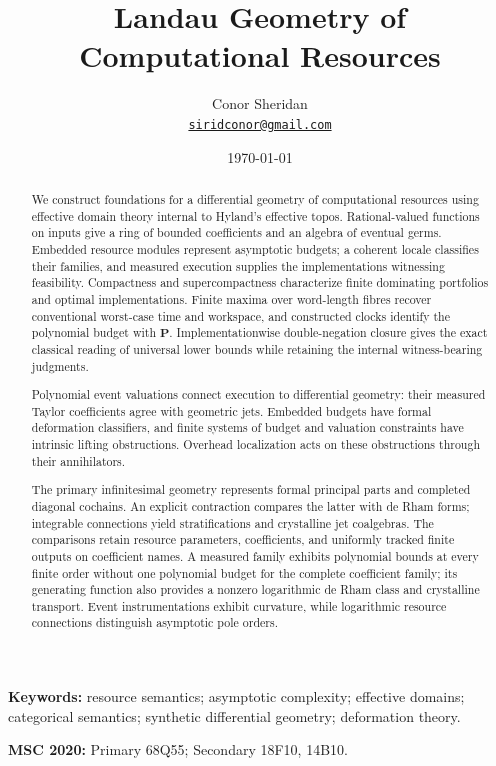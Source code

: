 \documentclass[11pt,a4paper]{article}
\title{Landau Geometry of Computational Resources}
\author{Conor Sheridan\\
  {\normalsize\href{mailto:siridconor@gmail.com}{\texttt{siridconor@gmail.com}}}}
\date{\today}
\numberwithin{algorithm}{section}
\numberwithin{equation}{section}
\theoremstyle{definition}
\theoremstyle{remark}
\theoremstyle{plain}
\theoremstyle{definition}
\theoremstyle{plain}
\begin{document}
\maketitle
\begin{abstract}
We construct foundations for a differential geometry of computational
resources using effective domain theory internal to Hyland's effective
topos. Rational-valued functions on inputs give a ring of bounded coefficients and an algebra of
eventual germs. Embedded resource modules represent asymptotic budgets;
a coherent locale classifies their families, and measured execution
supplies the implementations witnessing feasibility. Compactness and
supercompactness characterize finite dominating portfolios and optimal
implementations. Finite maxima over word-length fibres recover
conventional worst-case time and workspace, and constructed clocks
identify the polynomial budget with $\mathbf P$. Implementationwise
double-negation closure gives the exact classical reading of universal
lower bounds while retaining the internal witness-bearing judgments.

Polynomial event valuations connect execution to differential geometry:
their measured Taylor coefficients agree with geometric jets. Embedded
budgets have formal deformation classifiers, and finite systems of budget
and valuation constraints have intrinsic lifting obstructions. Overhead
localization acts on these obstructions through their annihilators.

The primary infinitesimal geometry represents formal principal parts and
completed diagonal cochains. An explicit contraction compares the latter
with de Rham forms; integrable connections yield stratifications and
crystalline jet coalgebras. The comparisons retain resource parameters,
coefficients, and uniformly tracked finite outputs on coefficient
names. A measured family
exhibits polynomial bounds at every finite order without one polynomial
budget for the complete coefficient family; its generating function also
provides a nonzero logarithmic de Rham class and crystalline transport.
Event instrumentations exhibit curvature, while logarithmic resource
connections distinguish asymptotic pole orders.
\end{abstract}

\medskip
\noindent\textbf{Keywords:} resource semantics; asymptotic complexity;
effective domains; categorical semantics; synthetic differential geometry;
deformation theory.
\par\noindent\textbf{MSC 2020:} Primary 68Q55; Secondary 18F10, 14B10.
\end{document}

